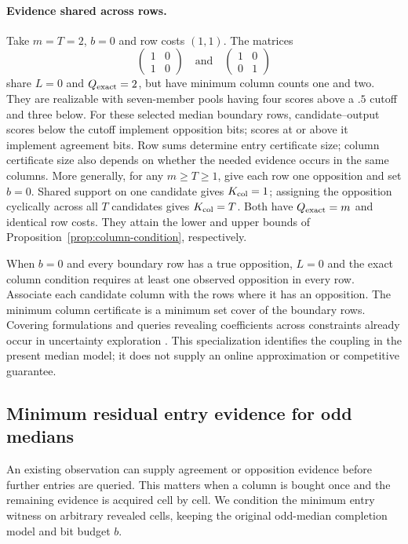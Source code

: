 \paragraph{Evidence shared across rows.}
Take $m=T=2$, $b=0$ and row costs $(1,1)$. The matrices
\[
 \begin{pmatrix}1&0\\1&0\end{pmatrix}
 \quad\text{and}\quad
 \begin{pmatrix}1&0\\0&1\end{pmatrix}
\]
share $L=0$ and $Q_{\rm exact}=2$, but have minimum column counts one and two. They are realizable with seven-member pools having four scores above a $.5$ cutoff and three below. For these selected median boundary rows, candidate--output scores below the cutoff implement opposition bits; scores at or above it implement agreement bits. Row sums determine entry certificate size; column certificate size also depends on whether the needed evidence occurs in the same columns. More generally, for any $m\ge T\ge1$, give each row one opposition and set $b=0$. Shared support on one candidate gives $K_{\rm col}=1$; assigning the opposition cyclically across all $T$ candidates gives $K_{\rm col}=T$. Both have $Q_{\rm exact}=m$ and identical row costs. They attain the lower and upper bounds of Proposition~\ref{prop:column-condition}, respectively.

When $b=0$ and every boundary row has a true opposition, $L=0$ and the exact column condition requires at least one observed opposition in every row. Associate each candidate column with the rows where it has an opposition. The minimum column certificate is a minimum set cover of the boundary rows. Covering formulations and queries revealing coefficients across constraints already occur in uncertainty exploration \citep{megow2023set,schloter2025knapsack}. This specialization identifies the coupling in the present median model; it does not supply an online approximation or competitive guarantee.

\subsection{Minimum residual entry evidence for odd medians}
\label{app:residual}
An existing observation can supply agreement or opposition evidence before further entries are queried. This matters when a column is bought once and the remaining evidence is acquired cell by cell. We condition the minimum entry witness on arbitrary revealed cells, keeping the original odd-median completion model and bit budget $b$.

